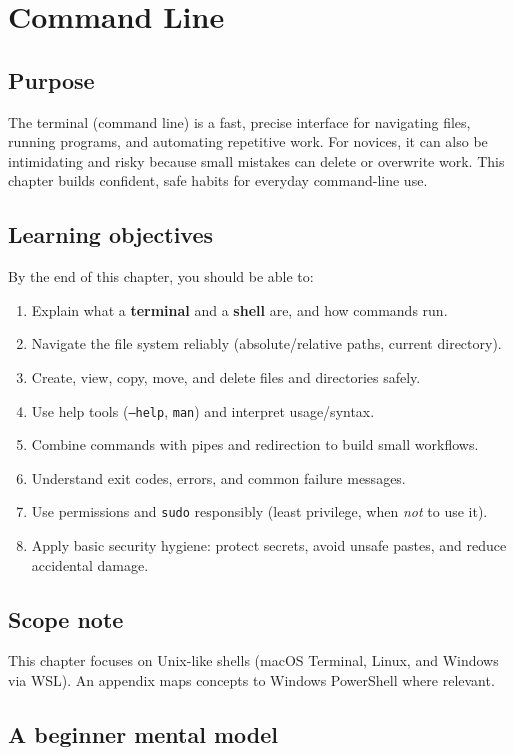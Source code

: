 \chapter{Command Line}
\label{ch:terminal}

\section*{Purpose}
The terminal (command line) is a fast, precise interface for navigating files, running programs, and automating repetitive work. For novices, it can also be intimidating and risky because small mistakes can delete or overwrite work. This chapter builds confident, safe habits for everyday command-line use.

\section*{Learning objectives}
By the end of this chapter, you should be able to:
\begin{enumerate}
\item Explain what a \textbf{terminal} and a \textbf{shell} are, and how commands run.
\item Navigate the file system reliably (absolute/relative paths, current directory).
\item Create, view, copy, move, and delete files and directories safely.
\item Use help tools (\texttt{--help}, \texttt{man}) and interpret usage/syntax.
\item Combine commands with pipes and redirection to build small workflows.
\item Understand exit codes, errors, and common failure messages.
\item Use permissions and \texttt{sudo} responsibly (least privilege, when \emph{not} to use it).
\item Apply basic security hygiene: protect secrets, avoid unsafe pastes, and reduce accidental damage.
\end{enumerate}

\section*{Scope note}
This chapter focuses on Unix-like shells (macOS Terminal, Linux, and Windows via WSL). An appendix maps concepts to Windows PowerShell where relevant.

\section{A beginner mental model}
